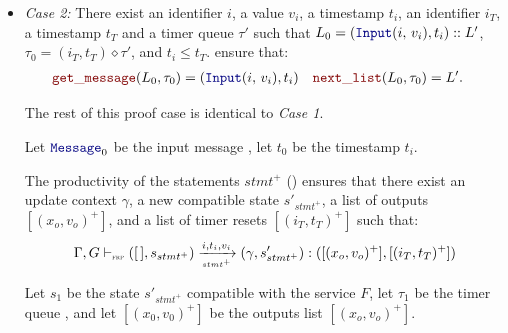 \begin{skippableproof}
\begin{itemize}
\begin{itemize}
                        The rule  ensures
                        that:
                        \begin{equation*}
                            \serviceOpSem{s_0}{\tau_0}{F}{\mess_0}{t_0}{s_1}{\tau_1}{(x_0, v_0)^+},
                        \end{equation*}

                        Let $L_1$ be the remaining list $L'$.

                  \item \textit{Case 2:} There exist an identifier $i$, a value $v_i$, a timestamp
                        $t_i$, an identifier $i_T$, a timestamp $t_T$ and a timer queue $\tau'$ such
                        that $L_0 = (\inputMess{i}{v_i}, t_i) :: L'$, $\tau_0 = (i_T, t_T) \diamond
                            \tau'$, and $t_i \le t_T$.
                        ensure that:
                        \begin{align*}
                            \getMess{L_0}{\tau_0}  & = (\inputMess{i}{v_i}, t_i) &
                            \nextList{L_0}{\tau_0} & = L'.
                        \end{align*}

                        The rest of this proof case is identical to \textit{Case 1}.

                        Let $\mess_0$ be the input message , let $t_0$ be the
                        timestamp $t_i$.

                        The productivity of the statements $stmt^+$ () ensures that there exist an update context
                        $\gamma$, a new compatible state $s'_{stmt^+}$, a list of outputs $[(x_o,
                                    v_o)^+]$, and a list of timer resets $[(i_T, t_T)^+]$ such that:
                        \begin{equation*}
                            \Gamma, G \vdash_{\textnormal{\tiny\textsc{frp}}} ([\,], s_{stmt^+}) \xrightarrow[\mbox{\tiny\ensuremath{stmt^+}}]{i, t_i, v_i} (\gamma, s'_{stmt^+}): ([(x_o, v_o)^+], [(i_T, t_T)^+])
                        \end{equation*}

                        Let $s_1$ be the state $s'_{stmt^+}$ compatible with the service $F$, let
                        $\tau_1$ be the timer queue , and let $[(x_0,
                                    v_0)^+]$ be the outputs list $[(x_o, v_o)^+]$.


\end{itemize}
\end{itemize}
\end{skippableproof}
